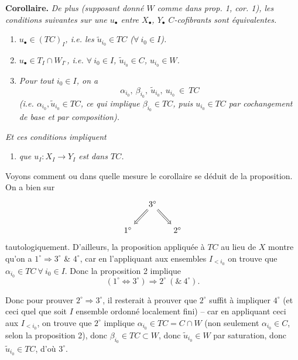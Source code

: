 \documentclass[11pt]{article}
\newcommand{\printedpage}[1]{\marginpar{\footnotesize p.~#1}}
\newcommand{\msp}[1]{\marginpar{\footnotesize [#1]}}
\begin{document}
\textbf{Corollaire.} \textit{De plus (supposant donné $W$ comme dans prop. 1, cor. 1), les conditions suivantes sur une $u_{\bullet}$ entre $X_{\bullet}$, $Y_{\bullet}$ $C$-cofibrants sont équivalentes.}
\begin{enumerate}
\item[$1^{\circ}$)] \textit{$u_{\bullet} \in (TC)_I$, i.e. les $\tilde{u}_{i_0} \in TC$ ($\forall\ i_0 \in I$).}
\item[$2^{\circ}$)] \textit{$u_{\bullet} \in T_I \cap W_{I^{\circ}}$, i.e. $\forall\ i_0 \in I$, $\tilde{u}_{i_0} \in C$, $u_{i_0} \in W$.} %
\item[$3^{\circ}$)] \textit{Pour tout $i_0 \in I$, on a}
\[
\alpha_{i_0},\ \beta_{i_0},\ \tilde{u}_{i_0},\ u_{i_0} \ \in \ TC
\]
\textit{(i.e. $\alpha_{i_0}, \tilde{u}_{i_0} \in TC$, ce qui implique $\beta_{i_0} \in TC$, puis $u_{i_0} \in TC$ par cochangement de base et par composition).}
\end{enumerate}
\textit{Et ces conditions impliquent}
\begin{enumerate}
\item[$4^{\circ}$)] \textit{que $u_I : X_I \longrightarrow Y_I$ est dans $TC$.}
\end{enumerate}

Voyons comment ou dans quelle mesure le corollaire se déduit de la proposition. On a bien sur %
\printedpage{5}
\[
\begin{tikzcd}[column sep=small]
& 3^{\circ} \arrow[dl, Rightarrow] \arrow[dr, Rightarrow] & \\
1^{\circ} & & 2^{\circ}
\end{tikzcd}
\]
tautologiquement. D'ailleurs, la proposition appliquée à $TC$ au lieu de $X$ montre qu'on a $1^{\circ} \Longrightarrow 3^{\circ}$ \& $4^{\circ}$, car en l'appliquant aux ensembles $I_{<i_0}$ on trouve que $\alpha_{i_0} \in TC\ \forall\ i_0 \in I$. Donc la proposition 2 implique %
\[
(1^{\circ} \Longleftrightarrow 3^{\circ}) \Longrightarrow 2^{\circ}\ (\&\ 4^{\circ}).
\]

\msp{page 9}

Donc pour prouver $2^{\circ} \Longrightarrow 3^{\circ}$, il resterait à prouver que $2^{\circ}$ suffit à impliquer $4^{\circ}$ (et ceci quel que soit $I$ ensemble ordonné localement fini) -- car en appliquant ceci aux $I_{<i_0}$, on trouve que $2^{\circ}$ implique $\alpha_{i_0} \in TC = C \cap W$ (non seulement $\alpha_{i_0} \in C$, selon la proposition 2), donc $\beta_{i_0} \in TC \subset W$, donc $\tilde{u}_{i_0} \in W$ par saturation, donc $\tilde{u}_{i_0} \in TC$, d'où $3^{\circ}$.
\end{document}
